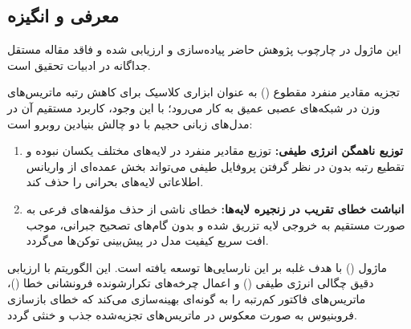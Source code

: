 \subsection{معرفی و انگیزه}
این ماژول در چارچوب پژوهش حاضر پیاده‌سازی و ارزیابی شده و فاقد مقاله مستقل جداگانه در ادبیات تحقیق است.

تجزیه مقادیر منفرد مقطوع () به عنوان ابزاری کلاسیک برای کاهش رتبه ماتریس‌های وزن در شبکه‌های عصبی عمیق به کار می‌رود؛ با این وجود، کاربرد مستقیم آن در مدل‌های زبانی حجیم با دو چالش بنیادین روبرو است:
\begin{enumerate}
    \item \textbf{توزیع ناهمگن انرژی طیفی:} توزیع مقادیر منفرد در لایه‌های مختلف یکسان نبوده و تقطیع رتبه بدون در نظر گرفتن پروفایل طیفی می‌تواند بخش عمده‌ای از واریانس اطلاعاتی لایه‌های بحرانی را حذف کند.
    \item \textbf{انباشت خطای تقریب در زنجیره لایه‌ها:} خطای ناشی از حذف مؤلفه‌های فرعی به صورت مستقیم به خروجی لایه تزریق شده و بدون گام‌های تصحیح جبرانی، موجب افت سریع کیفیت مدل در پیش‌بینی توکن‌ها می‌گردد.
\end{enumerate}

ماژول  () با هدف غلبه بر این نارسایی‌ها توسعه یافته است. این الگوریتم با ارزیابی دقیق چگالی انرژی طیفی () و اعمال چرخه‌های تکرارشونده فرونشانی خطا ()، ماتریس‌های فاکتور کم‌رتبه را به گونه‌ای بهینه‌سازی می‌کند که خطای بازسازی فروبنیوس به صورت معکوس در ماتریس‌های تجزیه‌شده جذب و خنثی گردد.

